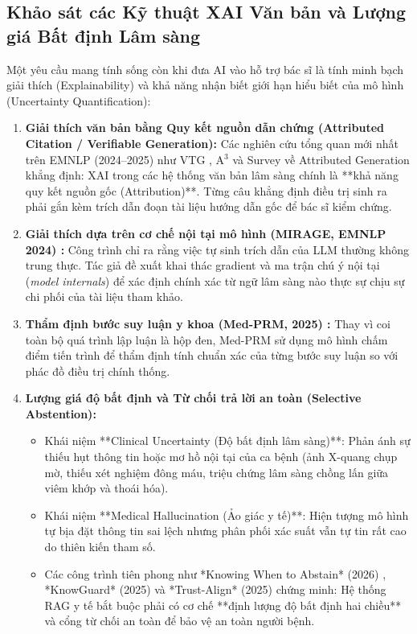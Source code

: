 \subsection{Khảo sát các Kỹ thuật XAI Văn bản và Lượng giá Bất định Lâm sàng}
Một yêu cầu mang tính sống còn khi đưa AI vào hỗ trợ bác sĩ là tính minh bạch giải thích (Explainability) và khả năng nhận biết giới hạn hiểu biết của mô hình (Uncertainty Quantification):
\begin{enumerate}
    \item \textbf{Giải thích văn bản bằng Quy kết nguồn dẫn chứng (Attributed Citation / Verifiable Generation):} Các nghiên cứu tổng quan mới nhất trên EMNLP (2024--2025) như VTG \cite{sun2024vtg}, A$^3$ \cite{alignment_attributed_2024} và Survey về Attributed Generation \cite{attribution_survey_2025} khẳng định: XAI trong các hệ thống văn bản lâm sàng chính là **khả năng quy kết nguồn gốc (Attribution)**. Từng câu khẳng định điều trị sinh ra phải gắn kèm trích dẫn đoạn tài liệu hướng dẫn gốc để bác sĩ kiểm chứng.
    \item \textbf{Giải thích dựa trên cơ chế nội tại mô hình (MIRAGE, EMNLP 2024) \cite{qi2024mirage}:} Công trình chỉ ra rằng việc tự sinh trích dẫn của LLM thường không trung thực. Tác giả đề xuất khai thác gradient và ma trận chú ý nội tại (\emph{model internals}) để xác định chính xác từ ngữ lâm sàng nào thực sự chịu sự chi phối của tài liệu tham khảo.
    \item \textbf{Thẩm định bước suy luận y khoa (Med-PRM, 2025) \cite{medprm2024}:} Thay vì coi toàn bộ quá trình lập luận là hộp đen, Med-PRM sử dụng mô hình chấm điểm tiến trình để thẩm định tính chuẩn xác của từng bước suy luận so với phác đồ điều trị chính thống.
    \item \textbf{Lượng giá độ bất định và Từ chối trả lời an toàn (Selective Abstention):}
    \begin{itemize}
        \item Khái niệm **Clinical Uncertainty (Độ bất định lâm sàng)**: Phản ánh sự thiếu hụt thông tin hoặc mơ hồ nội tại của ca bệnh (ảnh X-quang chụp mờ, thiếu xét nghiệm đông máu, triệu chứng lâm sàng chồng lấn giữa viêm khớp và thoái hóa).
        \item Khái niệm **Medical Hallucination (Ảo giác y tế)**: Hiện tượng mô hình tự bịa đặt thông tin sai lệch nhưng phân phối xác suất vẫn tự tin rất cao do thiên kiến tham số.
        \item Các công trình tiên phong như *Knowing When to Abstain* (2026) \cite{knowing_when_abstain_2026}, *KnowGuard* (2025) \cite{knowguard2024} và *Trust-Align* (2025) \cite{filice2025generate} chứng minh: Hệ thống RAG y tế bắt buộc phải có cơ chế **định lượng độ bất định hai chiều** và cổng từ chối an toàn để bảo vệ an toàn người bệnh.
    \end{itemize}
\end{enumerate}

